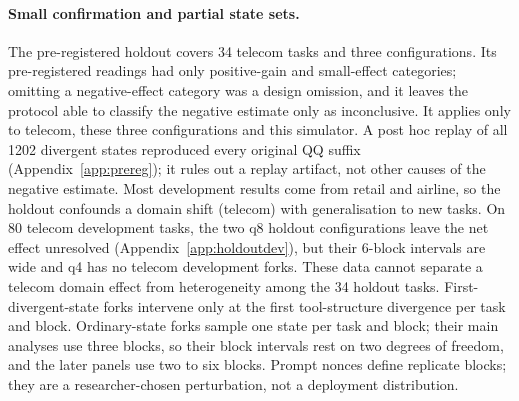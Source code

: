 \paragraph{Small confirmation and partial state sets.} The pre-registered holdout covers 34 telecom tasks and three configurations. Its pre-registered readings had only positive-gain and small-effect categories; omitting a negative-effect category was a design omission, and it leaves the protocol able to classify the negative estimate only as inconclusive. It applies only to telecom, these three configurations and this simulator. A post hoc replay of all 1202 divergent states reproduced every original QQ suffix (Appendix~\ref{app:prereg}); it rules out a replay artifact, not other causes of the negative estimate. %
Most development results come from retail and airline, so the holdout confounds a domain shift (telecom) with generalisation to new tasks. %
On 80 telecom development tasks, the two q8 holdout configurations leave the net effect unresolved (Appendix~\ref{app:holdoutdev}), but their 6-block intervals are wide and q4 has no telecom development forks. These data cannot separate a telecom domain effect from heterogeneity among the 34 holdout tasks. %
First-divergent-state forks intervene only at the first tool-structure divergence per task and block. Ordinary-state forks sample one state per task and block; their main analyses use three blocks, so their block intervals rest on two degrees of freedom, and the later panels use two to six blocks. Prompt nonces define replicate blocks; they are a researcher-chosen perturbation, not a deployment distribution.


